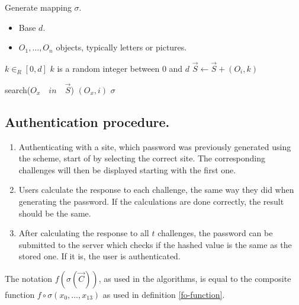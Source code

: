 \begin{algorithm}
    \caption{Generate mapping $\sigma$.}
    \begin{algorithmic}[1]
        \Require
            \Statex \begin{itemize}
                \item Base $d$.
                \item $O_1,\dots,O_n$ objects, typically letters or pictures.
            \end{itemize}
        
        \State $k \in_{R} [0,d]$
            \Comment $k$ is a random integer between $0$ and $d$
            \State $\vec S \leftarrow \vec S + (O_i,k)$
        \EndFor
        \Statex

            \State search($O_x\quad in\quad \vec S$)
            \State \Return $(O_x, i)$
        \EndFunction
        \Statex
        \Ensure $\sigma$
    \end{algorithmic}
    \label{gen-mapping}
\end{algorithm}
\subsection{Authentication procedure.}\label{subsec:auth}
\begin{enumerate}
    \item Authenticating with a site, which password was previously generated using the scheme, start of by selecting the correct site. The corresponding challenges will then be displayed starting with the first one.
    \item Users calculate the response to each challenge, the same way they did when generating the password. If the calculations are done correctly, the result should be the same.
    \item After calculating the response to all $t$ challenges, the password can be submitted to the server which checks if the hashed value is the same as the stored one. If it is, the user is authenticated.
\end{enumerate}

\begin{remark}
    The notation $f(\sigma(\vec C))$, as used in the algorithms, is equal to the composite function $f \circ \sigma(x_0,\dots,x_{13})$ as used in definition \ref{fo-function}.
\end{remark}

